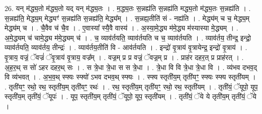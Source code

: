 \documentclass[17pt]{extarticle}
\begin{document}
26. यन् म॑द्ध्य॒तो म॑द्ध्य॒तो यद् यन् म॑द्ध्य॒तः । . म॒द्ध्य॒तः स॒न्नह्य॑ति स॒न्नह्य॑ति मद्ध्य॒तो म॑द्ध्य॒तः स॒न्नह्य॑ति । . स॒न्नह्य॑ति॒ मेद्ध्य॒म् मेद्ध्यꣳ॑ स॒न्नह्य॑ति स॒न्नह्य॑ति॒ मेद्ध्य᳚म् । . स॒न्नह्य॒तीति॑ सं - नह्य॑ति । . मेद्ध्य॑म् च च॒ मेद्ध्य॒म् मेद्ध्य॑म् च । . चै॒वैव च॑ चै॒व । . ए॒वास्या᳚ स्यै॒वै वास्य॑ । . अ॒स्या॒मे॒द्ध्य म॑मे॒द्ध्य म॑स्यास्या मे॒द्ध्यम् । . अ॒मे॒द्ध्यम् च॑ चामे॒द्ध्य म॑मे॒द्ध्यम् च॑ । . च॒ व्याव॑र्तयति॒ व्याव॑र्तयति च च॒ व्याव॑र्तयति । . व्याव॑र्तय॒ तीन्द्र॒ इन्द्रो॒ व्याव॑र्तयति॒ व्याव॑र्तय॒ तीन्द्रः॑ । . व्याव॑र्तय॒तीति॑ वि - आव॑र्तयति । . इन्द्रो॑ वृ॒त्राय॑ वृ॒त्रायेन्द्र॒ इन्द्रो॑ वृ॒त्राय॑ । . वृ॒त्राय॒ वज्रं॒ ॅवज्रं॑ ॅवृ॒त्राय॑ वृ॒त्राय॒ वज्र᳚म् । . वज्र॒म् प्र प्र वज्रं॒ ॅवज्र॒म् प्र । . प्राह॑र दहर॒त् प्र प्राह॑रत् । . अ॒ह॒र॒थ् स सो॑ ऽहर दहर॒थ् सः । . स त्रे॒धा त्रे॒धा स स त्रे॒धा । . त्रे॒धा वि वि त्रे॒धा त्रे॒धा वि । . व्य॑भव दभव॒द् वि व्य॑भवत् । . अ॒भ॒व॒थ् स्फ्यः स्फ्यो॑ ऽभव दभव॒थ् स्फ्यः । . स्फ्य स्तृती॑य॒म् तृती॑यꣳ॒॒ स्फ्यः स्फ्य स्तृती॑यम् । . तृती॑यꣳ॒॒ रथो॒ रथ॒ स्तृती॑य॒म् तृती॑यꣳ॒॒ रथः॑ । . रथ॒ स्तृती॑य॒म् तृती॑यꣳ॒॒ रथो॒ रथ॒ स्तृती॑यम् । . तृती॑यं॒ ॅयूपो॒ यूप॒ स्तृती॑य॒म् तृती॑यं॒ ॅयूपः॑ । . यूप॒ स्तृती॑य॒म् तृती॑यं॒ ॅयूपो॒ यूप॒ स्तृती॑यम् । . तृती॑यं॒ ॅये ये तृती॑य॒म् तृती॑यं॒ ॅये । \newline
\end{document}
